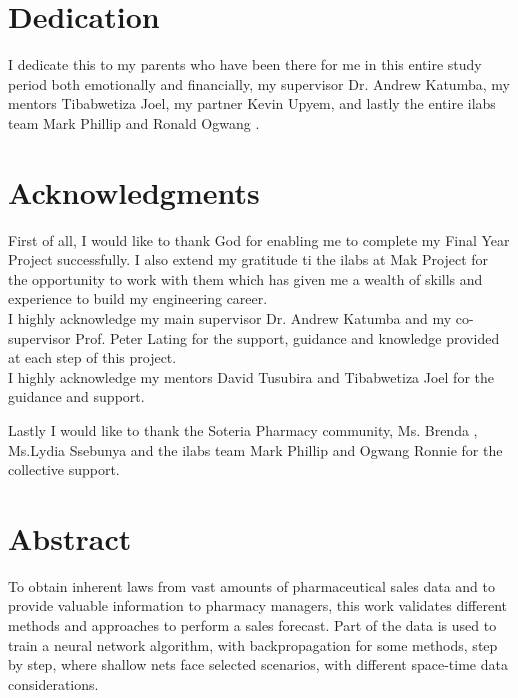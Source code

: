 \documentclass[12pt]{report}
\begin{document}
\newpage


\section*{Dedication}

\vspace{2cm}
\begin{center}
I dedicate this to my parents who have been there for me in this entire study period both emotionally and financially, my supervisor Dr. Andrew Katumba, my mentors Tibabwetiza Joel, my partner Kevin Upyem, and lastly the entire ilabs team Mark Phillip and Ronald Ogwang .
\end{center}



\newpage

\section*{Acknowledgments}
First of all, I would like to thank God for enabling me to complete my Final Year Project successfully. I also extend my gratitude ti the ilabs at Mak Project for the opportunity to work with them which has given me a wealth of skills and experience to build my engineering career.\\

I highly acknowledge my main supervisor Dr. Andrew Katumba and my co-supervisor Prof. Peter Lating for the support, guidance and knowledge provided at each step of this project.\\
I highly acknowledge my mentors David Tusubira and Tibabwetiza Joel for the guidance and support.

Lastly I would like to thank the Soteria Pharmacy community, Ms. Brenda , Ms.Lydia Ssebunya and the ilabs team Mark Phillip and Ogwang Ronnie for the collective support. 

\newpage



\section*{Abstract}


To obtain inherent laws from vast amounts of pharmaceutical sales data and to provide valuable information to pharmacy managers, this work validates different methods and approaches to perform a sales forecast. Part of the data is used to train a neural network algorithm, with backpropagation for some methods, step by step, where shallow nets face selected scenarios, with different space-time data considerations. 
\end{document}
